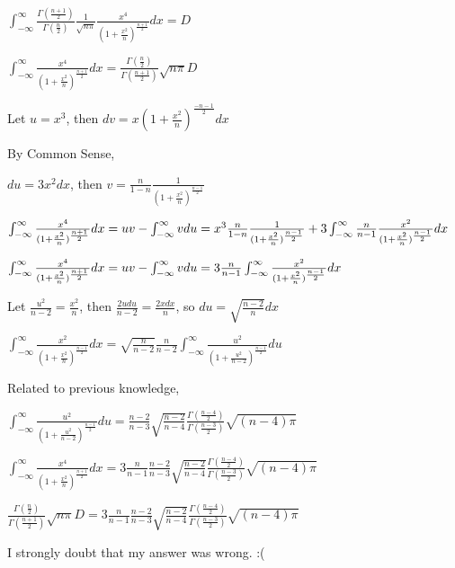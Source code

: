 \documentclass[20pt]{article}
\begin{document}
{\fontsize{20}{20}\selectfont 
$\int_{-\infty}^{\infty}{ \frac{\Gamma({\frac{n+1}{2}})}{\Gamma({\frac{n}{2}})} \frac{1}{\sqrt{n\pi}} \frac{x^4}{(1+\frac{x^2}{n})^{\frac{n+1}{2}}}}dx = D$ }

{\fontsize{20}{20}\selectfont 
$\int_{-\infty}^{\infty}{ \frac{x^4}{(1+\frac{x^2}{n})^{\frac{n+1}{2}}}}dx =\frac{\Gamma({\frac{n}{2}})}{\Gamma({\frac{n+1}{2}})} \sqrt{n\pi} D$ }


{\fontsize{20}{20}\selectfont 
 Let $u = x^3$, then $dv = x (1+\frac{x^2}{n})^{\frac{-n-1}{2}} dx $ }

{\fontsize{10}{10}\selectfont By Common Sense,}

 {\fontsize{20}{20}\selectfont 
  $du = 3x^2dx$, then $v = \frac{n}{1-n} \frac{1}{(1+\frac{x^2}{n})^{\frac{n-1}{2}}} $ }

{\fontsize{20}{20}\selectfont 
$\int_{-\infty}^{\infty}{ \frac{x^4}{(1+\frac{x^2}{n})^{\frac{n+1}{2}}}}dx = uv - \int_{-\infty}^{\infty} v du \\ = x^3 \frac{n}{1-n} \frac{1}{(1+\frac{x^2}{n})^{\frac{n-1}{2}}} +  3 \int_{-\infty}^{\infty} \frac{n}{n-1} \frac{x^2}{(1+\frac{x^2}{n})^{\frac{n-1}{2}}} dx$}



{\fontsize{20}{20}\selectfont 
$\int_{-\infty}^{\infty}{ \frac{x^4}{(1+\frac{x^2}{n})^{\frac{n+1}{2}}}}dx = uv - \int_{-\infty}^{\infty} v du \\ = 3  \frac{n}{n-1} \int_{-\infty}^{\infty} \frac{x^2}{(1+\frac{x^2}{n})^{\frac{n-1}{2}}} dx$}


{\fontsize{20}{20}\selectfont 
 Let $\frac{u^2}{n-2} = \frac{x^2}{n}$, then $\frac{2udu}{n-2} = \frac{2xdx}{n} $, so $du = \sqrt{\frac{n-2}{n}}dx$ }
 
 
{\fontsize{20}{20}\selectfont $ \int_{-\infty}^{\infty} \frac{x^2}{(1+\frac{x^2}{n})^{\frac{n-1}{2}}} dx = \sqrt{\frac{n}{n-2}} \frac{n}{n-2} \int_{-\infty}^{\infty}  \frac{u^2}{(1+\frac{u^2}{n-2})^{\frac{n-1}{2}}} du $
}

{\fontsize{10}{10}\selectfont Related to previous knowledge,}

{\fontsize{20}{20}\selectfont $\int_{-\infty}^{\infty} \frac{u^2}{(1+\frac{u^2}{n-2})^{\frac{n-1}{2}}} du = \frac{n-2}{n-3} \sqrt{\frac{n-2}{n-4}}  \frac{\Gamma({\frac{n-4}{2}})}{\Gamma({\frac{n-3}{2}})}  \sqrt{(n-4)\pi}$}

{\fontsize{20}{20}\selectfont $\int_{-\infty}^{\infty}{ \frac{x^4}{(1+\frac{x^2}{n})^{\frac{n+1}{2}}}}dx  = 3  \frac{n}{n-1} \frac{n-2}{n-3} \sqrt{\frac{n-2}{n-4}}  \frac{\Gamma({\frac{n-4}{2}})}{\Gamma({\frac{n-3}{2}})}  \sqrt{(n-4)\pi}$}

{\fontsize{20}{20}\selectfont $\frac{\Gamma({\frac{n}{2}})}{\Gamma({\frac{n+1}{2}})} \sqrt{n\pi} D = 3  \frac{n}{n-1} \frac{n-2}{n-3} \sqrt{\frac{n-2}{n-4}}  \frac{\Gamma({\frac{n-4}{2}})}{\Gamma({\frac{n-3}{2}})}  \sqrt{(n-4)\pi}$}

{\fontsize{10}{10}\selectfont I strongly doubt that my answer was wrong. :(}
\end{document}
